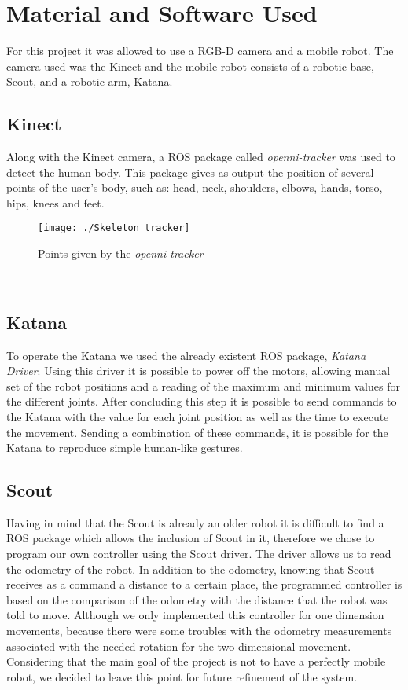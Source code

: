 
\section{Material and Software Used}
For this project it was allowed to use a RGB-D camera and a mobile robot. The camera used was the Kinect and the mobile robot consists of a robotic base, Scout, and a robotic arm, Katana.\\

\subsection{Kinect}
Along with the Kinect camera, a ROS package called \textit{openni-tracker} was used to detect the human body. This package gives as output the position of several points of the user's body, such as: head, neck, shoulders, elbows, hands, torso, hips, knees and feet.
\begin{figure}[!h]
	\centering
		\texttt{[image: ./Skeleton\_tracker]}
	\caption{Points given by the \textit{openni-tracker}}
\end{figure}\\

\subsection{Katana}
To operate the Katana we used the already existent ROS package, \textit{Katana Driver}. Using this driver it is possible to power off the motors, allowing manual set of the robot positions and a reading of the maximum and minimum values for the different joints. After concluding this step it is possible to send commands to the Katana with the value for each joint position as well as the time to execute the movement. Sending a combination of these commands, it is possible for the Katana to reproduce simple human-like gestures.\\

\subsection{Scout}
Having in mind that the Scout is already an older robot it is difficult to find a ROS package which allows the inclusion of Scout in it, therefore we chose to program our own controller using the Scout driver. The driver allows us to read the odometry of the robot. In addition to the odometry, knowing that Scout receives as a command a distance to a certain place, the programmed controller is based on the comparison of the odometry with the distance that the robot was told to move. Although we only implemented this controller for one dimension movements, because there were some troubles with the odometry measurements associated with the needed rotation for the two dimensional movement. Considering that the main goal of the project is not to have a perfectly mobile robot, we decided to leave this point for future refinement of the system.\\
